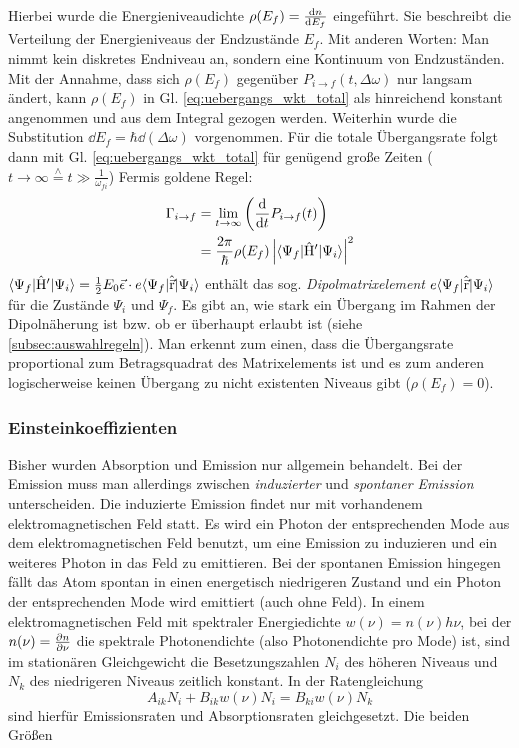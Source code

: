 Hierbei wurde die Energieniveaudichte $\rho(E_f)=\frac{\mathrm{d} n}{\mathrm{d} E_f}$ eingeführt. Sie
beschreibt die Verteilung der Energieniveaus der Endzustände $E_f$. Mit anderen
Worten: Man nimmt kein diskretes Endniveau an, sondern eine Kontinuum
von Endzuständen. Mit der Annahme, dass sich $\rho(E_f)$ gegenüber $P_{i\to
f}(t,\Delta\omega)$ nur langsam ändert, kann $\rho(E_f)$ in Gl. \eqref{eq:uebergangs_wkt_total} als hinreichend konstant angenommen und aus dem Integral gezogen werden. Weiterhin wurde die Substitution $\dd E_f=\hbar\dd(\Delta\omega)$ vorgenommen. Für die
totale Übergangsrate folgt dann mit Gl. \eqref{eq:uebergangs_wkt_total}
für genügend große Zeiten ($t\to\infty\stackrel{\wedge}{=}
t\gg\frac{1}{\omega_{fi}}$) Fermis
goldene Regel:
\begin{equation}\label{eq:uebergangs_rate_total}
	\begin{split}
		\Gamma_{i\to f}
		&= \lim_{t\to\infty}{\left(\frac{\mathrm{d} }{\mathrm{d} t}{P_{i\to f}(t)}\right)}\\
		&= \frac{2\pi}{\hbar}\rho(E_f)\left|\langle{\Psi_f}|\hat{\mathrm{H}}'|{\Psi_i}\rangle\right|^2
	\end{split}
\end{equation}
$\langle{\Psi_f}|\hat{\mathrm{H}}'|{\Psi_i}\rangle =
\frac{1}{2}E_0\vec{\epsilon}\cdot e\langle{\Psi_f}|\hat{\vec{\mathrm{r}}}|{\Psi_i}\rangle$ enthält
das sog. \textit{Dipolmatrixelement} $e\langle{\Psi_f}|\hat{\vec{\mathrm{r}}}|{\Psi_i}\rangle$ für die Zustände
$\Psi_i$ und $\Psi_f$. Es gibt an, wie stark ein Übergang im Rahmen der
Dipolnäherung ist bzw. ob er überhaupt erlaubt ist (siehe
\ref{subsec:auswahlregeln}). Man erkennt zum einen, dass die Übergangsrate proportional zum
Betragsquadrat des Matrixelements ist und es zum anderen logischerweise keinen
Übergang zu nicht existenten Niveaus gibt ($\rho(E_f)=0$). 

\subsubsection{Einsteinkoeffizienten}\label{subsubsec:einsteinkoeffizienten}
Bisher wurden Absorption und Emission nur allgemein behandelt. Bei der Emission
muss man allerdings zwischen \textit{induzierter} und \textit{spontaner
Emission} unterscheiden. Die induzierte Emission findet nur mit vorhandenem
elektromagnetischen Feld statt. Es wird ein Photon der entsprechenden Mode aus
dem elektromagnetischen Feld benutzt, um eine Emission zu induzieren und ein
weiteres Photon in das Feld zu emittieren. Bei der spontanen Emission hingegen
fällt das Atom spontan in einen energetisch niedrigeren Zustand und ein
Photon der entsprechenden Mode wird emittiert (auch ohne Feld). In einem
elektromagnetischen Feld mit spektraler Energiedichte $w(\nu)=n(\nu)h\nu$, bei
der $n(\nu)=\frac{\partial n}{\partial \nu}$ die spektrale Photonendichte (also Photonendichte
pro Mode) ist, sind im stationären Gleichgewicht die Besetzungszahlen $N_i$ des
höheren Niveaus und $N_k$ des niedrigeren Niveaus zeitlich konstant. In der Ratengleichung
\begin{equation}\label{eq:raten_gleichung}
	A_{ik}N_i+B_{ik}w(\nu)N_i=B_{ki}w(\nu)N_k
\end{equation}
sind hierfür Emissionsraten und Absorptionsraten gleichgesetzt.
Die beiden Größen

